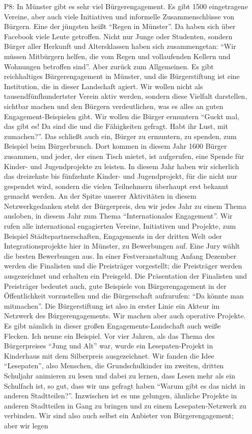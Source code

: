 \begin{itemize}
    \item[P8:] In M{\"u}nster gibt es sehr viel B{\"u}rgerengagement. Es gibt 1500 eingetragene Vereine, aber auch viele Initiativen und informelle Zusammenschl{\"u}sse von B{\"u}rgern. Eine der j{\"u}ngsten hei{\ss}t "`Regen in M{\"u}nster"'. Da haben sich {\"u}ber Facebook viele Leute getroffen. Nicht nur Junge oder Studenten, sondern B{\"u}rger aller Herkunft und Altersklassen haben sich zusammengetan: "`Wir m{\"u}ssen Mitb{\"u}rgern helfen, die vom Regen und vollaufenden Kellern und Wohnungen betroffen sind"'. Aber zur{\"u}ck zum Allgemeinen. Es gibt reichhaltiges B{\"u}rgerengagement in M{\"u}nster, und die B{\"u}rgerstiftung ist eine Institution, die in dieser Landschaft agiert. Wir wollen nicht als tausendf{\"u}nfhundertster Verein aktiv werden, sondern diese Vielfalt darstellen, sichtbar machen und den B{\"u}rgern verdeutlichen, was es alles an guten Engagement-Beispielen gibt. Wir wollen die B{\"u}rger ermuntern "`Guckt mal, das gibt es! Da sind die und die F{\"a}higkeiten gefragt. Habt ihr Lust, mit zumachen?"'. Das schlie{\ss}t auch ein, B{\"u}rger zu ermuntern, zu spenden, zum Beispiel beim B{\"u}rgerbrunch. Dort kommen in diesem Jahr 1600 B{\"u}rger zusammen, und jeder, der einen Tisch mietet, ist aufgerufen, eine Spende f{\"u}r Kinder- und Jugendprojekte zu leisten. In diesem Jahr haben wir sicherlich das dreizehnte bis f{\"u}nfzehnte Kinder- und Jugendprojekt, f{\"u}r die nicht nur gespendet wird, sondern die vielen Teilnehmern {\"u}berhaupt erst bekannt gemacht werden. An der Spitze unserer Aktivit{\"a}ten in diesem Netzwerkgedanken steht der B{\"u}rgerpreis, den wir jedes Jahr zu einem Thema ausloben, in diesem Jahr zum Thema "`Internationales Engagement"'. Wir rufen alle international engagierten Vereine, Initiativen und Projekte, zum Beispiel St{\"a}dtepartnerschaften, Engagements in der dritten Welt oder Integrationsprojekte hier in M{\"u}nster, zu Bewerbungen auf. Eine Jury w{\"a}hlt die besten Bewerbungen aus. In einer Festveranstaltung Anfang Dezember werden die Finalisten und die Preistr{\"a}ger vorgestellt; die Preistr{\"a}ger werden ausgezeichnet und erhalten ein Preisgeld. Die Pr{\"a}sentation der Finalisten und Preistr{\"a}ger bedeutet auch, gute Beispiele von B{\"u}rgerengagement in der {\"O}ffentlichkeit vorzustellen und die B{\"u}rgerschaft aufzurufen: "`Da k{\"o}nnte man mitmachen"'. Die B{\"u}rgerstiftung ist also in erster Linie ein Akteur im Netzwerk des B{\"u}rgerengagements. Wir machen aber auch operative Projekte. Es gibt n{\"a}mlich in dieser gro{\ss}en Engagements-Landschaft auch wei{\ss}e Flecken. Ich nenne ein Beispiel. Vor vier Jahren, als das Thema des B{\"u}rgerpreises "`Jung und Alt"' war, wurde ein Lesepaten-Projekt in Kinderhaus mit dem Silberpreis ausgezeichnet. Wir fanden die Idee "`Lesepaten"', also Menschen, die Grundschulkinder im zweiten, dritten Schuljahr animieren zu lesen und dabei zu lernen, dass Lesen mehr als ein Schulfach ist, so gut, dass wir uns gefragt haben "`Warum gibt es das nicht in anderen Stadtteilen?"'. Inzwischen ist es uns gelungen, {\"a}hnliche Projekte in anderen Stadtteilen in Gang zu bringen und zu einem Lesepaten-Netzwerk zu verbinden. Wir sind also auch selbst ein Anbieter von B{\"u}rgerengagement; aber wir legen 
\end{itemize}
